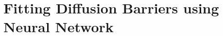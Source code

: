 \section{Fitting Diffusion Barriers using Neural Network}
\label{Chap:Al/Vac:section:NN}



















\newpage
\begingroup
\begin{figure}[!ht]
  \centering
\caption[]{}
\label{Chap:Al/Vac:fig:fitting_all}
\end{figure}
\endgroup
